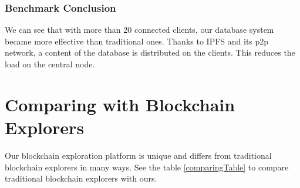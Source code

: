 \subsubsection{Benchmark Conclusion}
We can see that with more than 20 connected clients, our database system became more effective than traditional ones. Thanks to IPFS and its p2p network, a content of the database is distributed on the clients. This reduces the load on the central node.

\section{Comparing with Blockchain Explorers}
Our blockchain exploration platform is unique and differs from traditional blockchain explorers in many ways. See the table \ref{comparingTable} to compare traditional blockchain explorers with ours. 

